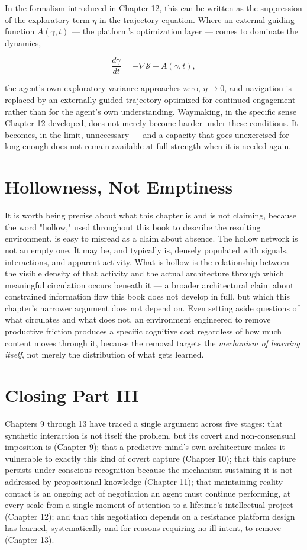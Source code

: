 \documentclass[12pt,a4paper]{book}
\begin{document}
In the formalism introduced in Chapter 12, this can be written as the suppression of the exploratory term $\eta$ in the trajectory equation. Where an external guiding function $A(\gamma, t)$ — the platform's optimization layer — comes to dominate the dynamics,

\[\frac{d\gamma}{dt} = -\nabla \mathcal{S} + A(\gamma, t),\]

the agent's own exploratory variance approaches zero, $\eta \to 0$, and navigation is replaced by an externally guided trajectory optimized for continued engagement rather than for the agent's own understanding. Waymaking, in the specific sense Chapter 12 developed, does not merely become harder under these conditions. It becomes, in the limit, unnecessary — and a capacity that goes unexercised for long enough does not remain available at full strength when it is needed again.

\section{Hollowness, Not Emptiness}

It is worth being precise about what this chapter is and is not claiming, because the word "hollow," used throughout this book to describe the resulting environment, is easy to misread as a claim about absence. The hollow network is not an empty one. It may be, and typically is, densely populated with signals, interactions, and apparent activity. What is hollow is the relationship between the visible density of that activity and the actual architecture through which meaningful circulation occurs beneath it — a broader architectural claim about constrained information flow this book does not develop in full, but which this chapter's narrower argument does not depend on. Even setting aside questions of what circulates and what does not, an environment engineered to remove productive friction produces a specific cognitive cost regardless of how much content moves through it, because the removal targets the \emph{mechanism of learning itself}, not merely the distribution of what gets learned.

\section{Closing Part III}

Chapters 9 through 13 have traced a single argument across five stages: that synthetic interaction is not itself the problem, but its covert and non-consensual imposition is (Chapter 9); that a predictive mind's own architecture makes it vulnerable to exactly this kind of covert capture (Chapter 10); that this capture persists under conscious recognition because the mechanism sustaining it is not addressed by propositional knowledge (Chapter 11); that maintaining reality-contact is an ongoing act of negotiation an agent must continue performing, at every scale from a single moment of attention to a lifetime's intellectual project (Chapter 12); and that this negotiation depends on a resistance platform design has learned, systematically and for reasons requiring no ill intent, to remove (Chapter 13).
\end{document}
